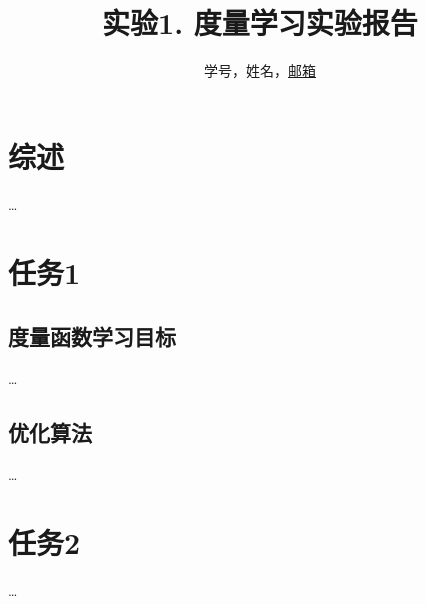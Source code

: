 \documentclass[a4paper,UTF8]{article}
\theoremstyle{definition}
\begin{document}
\title{实验1. 度量学习实验报告}
\author{学号，姓名，\url{邮箱}}
\maketitle

\section*{综述}
	\dots

\section*{任务1}
	\subsection*{度量函数学习目标}
		\dots
	\subsection*{优化算法}
		\dots
		
\section*{任务2}
	\dots
\end{document}
